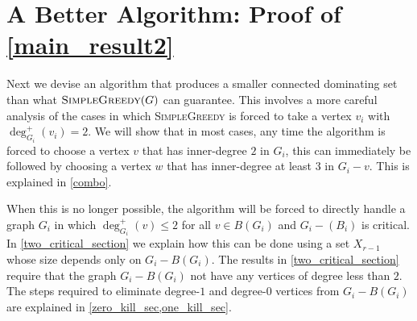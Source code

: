 \documentclass{article}
\theoremstyle{definition}
\begin{document}
%
%

\section{A Better Algorithm: Proof of \cref{main_result2}}
\label{full_result}

Next we devise an algorithm that produces a smaller connected dominating set than what $\textsc{SimpleGreedy}(G)$ can guarantee.  This involves a more careful analysis of the cases in which \textsc{SimpleGreedy} is forced to take a vertex $v_i$ with $\deg^+_{G_i}(v_i)=2$.  We will show that in most cases, any time the algorithm is forced to choose a vertex $v$ that has inner-degree $2$ in $G_i$, this can immediately be followed by choosing a vertex $w$ that has inner-degree at least $3$ in $G_i-v$.  This is explained in \cref{combo}.

When this is no longer possible, the algorithm will be forced to directly handle a graph $G_i$ in which $\deg^+_{G_i}(v)\le 2$ for all $v\in B(G_i)$ and $G_i-(B_i)$ is critical.  In \cref{two_critical_section} we explain how this can be done using a set $X_{r-1}$ whose size depends only on $G_i-B(G_i)$.  The results in \cref{two_critical_section} require that the graph $G_i-B(G_i)$ not have any vertices of degree less than $2$.  The steps required to eliminate degree-$1$ and degree-$0$ vertices from $G_i-B(G_i)$ are explained in \cref{zero_kill_sec,one_kill_sec}.
\end{document}

